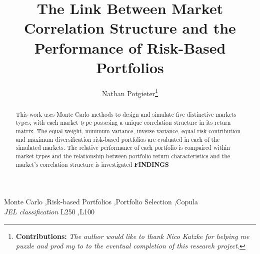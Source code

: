 \documentclass[11pt,preprint, authoryear]{elsarticle}
\numberwithin{equation}{section}
\numberwithin{figure}{section}
\numberwithin{table}{section}
\let\rmarkdownfootnote\footnote%
\def\footnote{\protect\rmarkdownfootnote}
\begin{document}
\begin{frontmatter}  %

\title{The Link Between Market Correlation Structure and the Performance of
Risk-Based Portfolios}





\author[Add1]{Nathan Potgieter\footnote{\textbf{Contributions:} \newline \emph{The
  author would like to thank Nico Katzke for helping me puzzle and prod
  my to to the eventual completion of this research project.}}}





\address[Add1]{Stellenbosch University, Stellenbosch, South Africa}


\begin{abstract}
\small{
This work uses Monte Carlo methods to design and simulate five
distinctive markets types, with each market type possesing a unique
correlation structure in its return matrix. The equal weight, minimum
variance, inverse variance, equal risk contribution and maximum
diversification risk-based portfolios are evaluated in each of the
simulated markets. The relative performance of each portfolio is
compaired within market types and the relationship between portfolio
return characteristics and the market's correlation structure is
investigated \textbf{FINDINGS}
}
\end{abstract}

\vspace{1cm}

\begin{keyword}
\footnotesize{
Monte Carlo \sep Risk-based Portfolios \sep Portfolio Selection
\sep Copula \\ \vspace{0.3cm}
\textit{JEL classification} L250 \sep L100
}
\end{keyword}
\vspace{0.5cm}
\end{frontmatter}



\pagestyle{fancy}
\chead{}
\rhead{}
\lfoot{}
\lhead{}
\cfoot{}

\end{document}
